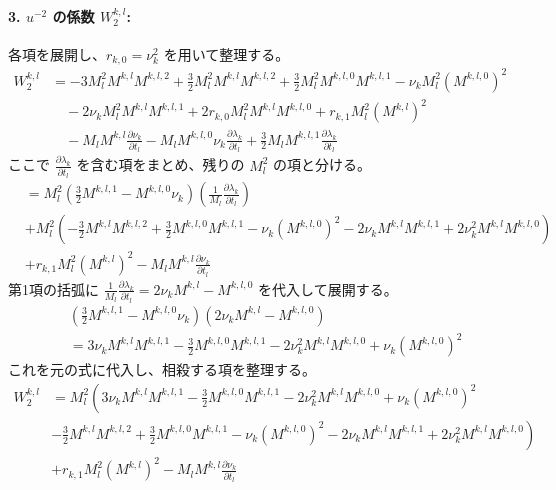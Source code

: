 \documentclass[paper=a4, fontsize=11pt]{jlreq} %
\theoremstyle{break}
\theoremstyle{qa}
\begin{document}
\paragraph{3. $u^{-2}$ の係数 $W_2^{k,l}$:}
各項を展開し、$r_{k,0} = \nu_k^2$ を用いて整理する。
\begin{align*}
W_2^{k,l} &= -3 M_l^2 M^{k,l} M^{k,l,2} + \frac{3}{2} M_l^2 M^{k,l} M^{k,l,2} + \frac{3}{2} M_l^2 M^{k,l,0} M^{k,l,1} - \nu_k M_l^2 (M^{k,l,0})^2\\
&\hspace{1em}- 2\nu_k M_l^2 M^{k,l} M^{k,l,1} + 2r_{k,0} M_l^2 M^{k,l} M^{k,l,0} + r_{k,1} M_l^2 (M^{k,l})^2\\
&\hspace{1em}- M_l M^{k,l} \frac{\partial \nu_k}{\partial t_l} - M_l M^{k,l,0} \nu_k \frac{\partial \lambda_k}{\partial t_l} + \frac{3}{2} M_l M^{k,l,1} \frac{\partial \lambda_k}{\partial t_l}
\end{align*}
ここで $\frac{\partial \lambda_k}{\partial t_l}$ を含む項をまとめ、残りの $M_l^2$ の項と分ける。
\begin{align*}
&= M_l^2 \left( \frac{3}{2} M^{k,l,1} - M^{k,l,0} \nu_k \right) \left( \frac{1}{M_l} \frac{\partial \lambda_k}{\partial t_l} \right)\\
&+ M_l^2 \left( -\frac{3}{2} M^{k,l} M^{k,l,2} + \frac{3}{2} M^{k,l,0} M^{k,l,1} - \nu_k (M^{k,l,0})^2 - 2\nu_k M^{k,l} M^{k,l,1} + 2\nu_k^2 M^{k,l} M^{k,l,0} \right)\\
&+ r_{k,1} M_l^2 (M^{k,l})^2 - M_l M^{k,l} \frac{\partial \nu_k}{\partial t_l}
\end{align*}
第1項の括弧に $\frac{1}{M_l} \frac{\partial \lambda_k}{\partial t_l} = 2\nu_k M^{k,l} - M^{k,l,0}$ を代入して展開する。
\begin{align*}
&\left( \frac{3}{2} M^{k,l,1} - M^{k,l,0} \nu_k \right) ( 2\nu_k M^{k,l} - M^{k,l,0} )\\
&= 3\nu_k M^{k,l} M^{k,l,1} - \frac{3}{2} M^{k,l,0} M^{k,l,1} - 2\nu_k^2 M^{k,l} M^{k,l,0} + \nu_k (M^{k,l,0})^2
\end{align*}
これを元の式に代入し、相殺する項を整理する。
\begin{align*}
W_2^{k,l} &= M_l^2 \left( 3\nu_k M^{k,l} M^{k,l,1} - \frac{3}{2} M^{k,l,0} M^{k,l,1} - 2\nu_k^2 M^{k,l} M^{k,l,0} + \nu_k (M^{k,l,0})^2 \right.\\
&\left. -\frac{3}{2} M^{k,l} M^{k,l,2} + \frac{3}{2} M^{k,l,0} M^{k,l,1} - \nu_k (M^{k,l,0})^2 - 2\nu_k M^{k,l} M^{k,l,1} + 2\nu_k^2 M^{k,l} M^{k,l,0} \right)\\
&+ r_{k,1} M_l^2 (M^{k,l})^2 - M_l M^{k,l} \frac{\partial \nu_k}{\partial t_l}
\end{align*}
\end{document}
